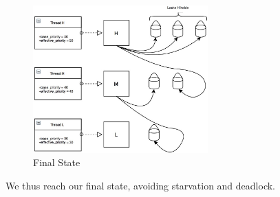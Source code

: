 \documentclass{article}
\renewcommand{\_}{\char`_}
\begin{document}
\begin{figure}[ht!]
\centering
\hspace{3em}
\includegraphics[width=0.6\textwidth]{Images/Task1/6Nested}
\caption{Final State}
\end{figure}

We thus reach our final state, avoiding starvation and deadlock.


%    
\end{document}
